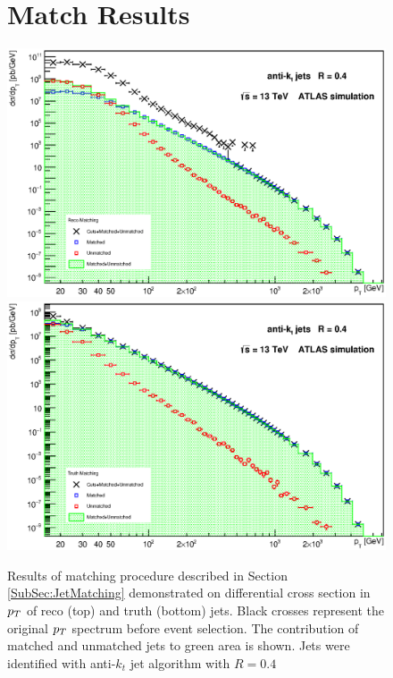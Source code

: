 \begin{appendices}
\begin{figure}[p]
\section{Match Results}
\label{sec:MatchResults}
  \centering
  \includegraphics[width=\textwidth]{Chapter3/SignalMatching.eps}
  \includegraphics[width=\textwidth]{Chapter3/TruthMatching.eps}
  \caption{Results of matching procedure described in Section
  \ref{SubSec:JetMatching} demonstrated on differential cross section in $p_{T}$ of
  reco (top) and truth (bottom) jets. Black crosses represent the original
  $p_{T}$ spectrum before event selection. The contribution of matched and unmatched jets to
  green area is shown. Jets were identified with anti-$k_t$ jet algorithm with
  $R=0.4$}
  \label{fig:Matching}
\end{figure}

\begin{figure}[p]

\end{figure}
\end{appendices}
